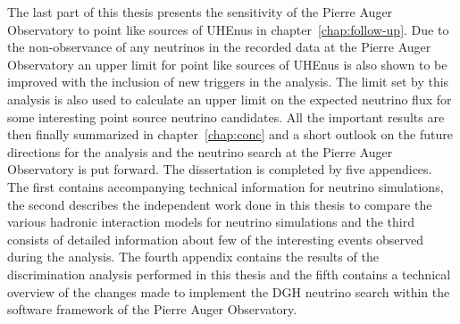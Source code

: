 The last part of this thesis presents the sensitivity of the Pierre Auger Observatory to point like sources of \glspl{UHEnu} in chapter~\ref{chap:follow-up}. Due to the non-observance of any neutrinos in the recorded data at the Pierre Auger Observatory an upper limit for point like sources of \glspl{UHEnu} is also shown to be improved with the inclusion of new triggers in the analysis. The limit set by this analysis is also used to calculate an upper limit on the expected neutrino flux for some interesting point source neutrino candidates. All the important results are then finally summarized in chapter~\ref{chap:conc} and a short outlook on the future directions for the analysis and the neutrino search at the Pierre Auger Observatory is put forward. The dissertation is completed by five appendices. The first contains accompanying technical information for neutrino simulations, the second describes the independent work done in this thesis to compare the various hadronic interaction models for neutrino simulations and the third consists of detailed information about few of the interesting events observed during the analysis. The fourth appendix contains the results of the discrimination analysis performed in this thesis and the fifth contains a technical overview of the changes made to implement the \gls{DGH} neutrino search within the software framework of the Pierre Auger Observatory. 

